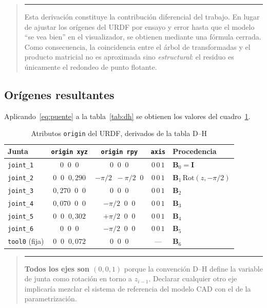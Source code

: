 \documentclass[11pt,a4paper]{article}
\newcommand{\mat}[1]{\mathbf{#1}}
\newenvironment{nota}
  {\begin{quote}\small\color{oscuro}\rule{2pt}{\baselineskip}\hspace{6pt}\ignorespaces}
  {\end{quote}}
\begin{document}
\begin{nota}
Esta derivación constituye la contribución diferencial del trabajo. En
lugar de ajustar los orígenes del URDF por ensayo y error hasta que el
modelo ``se vea bien'' en el visualizador, se obtienen mediante una
fórmula cerrada. Como consecuencia, la coincidencia entre el árbol de
transformadas y el producto matricial no es aproximada sino
\emph{estructural}: el residuo es únicamente el redondeo de punto
flotante.
\end{nota}

\subsection{Orígenes resultantes}

Aplicando~\eqref{eq:puente} a la tabla~\ref{tab:dh} se obtienen los
valores del cuadro~\ref{tab:origenesurdf}.

\begin{table}[h]
\centering
\caption{Atributos \texttt{origin} del URDF, derivados de la tabla D--H}
\label{tab:origenesurdf}
\small
\begin{tabular}{@{}lcccl@{}}
\toprule
\textbf{Junta} & \texttt{origin xyz} & \texttt{origin rpy} & \texttt{axis} & \textbf{Procedencia} \\
\midrule
\texttt{joint\_1} & $0\;\;0\;\;0$ & $0\;\;0\;\;0$ & $0\,0\,1$ & $\mat{B}_0 = \mat{I}$ \\
\texttt{joint\_2} & $0\;\;0\;\;0{,}290$ & $-\pi/2\;\;-\pi/2\;\;0$ & $0\,0\,1$ & $\mat{B}_1\,\mathrm{Rot}(z,-\pi/2)$ \\
\texttt{joint\_3} & $0{,}270\;\;0\;\;0$ & $0\;\;0\;\;0$ & $0\,0\,1$ & $\mat{B}_2$ \\
\texttt{joint\_4} & $0{,}070\;\;0\;\;0$ & $-\pi/2\;\;0\;\;0$ & $0\,0\,1$ & $\mat{B}_3$ \\
\texttt{joint\_5} & $0\;\;0\;\;0{,}302$ & $+\pi/2\;\;0\;\;0$ & $0\,0\,1$ & $\mat{B}_4$ \\
\texttt{joint\_6} & $0\;\;0\;\;0$ & $-\pi/2\;\;0\;\;0$ & $0\,0\,1$ & $\mat{B}_5$ \\
\texttt{tool0} (fija) & $0\;\;0\;\;0{,}072$ & $0\;\;0\;\;0$ & --- & $\mat{B}_6$ \\
\bottomrule
\end{tabular}
\end{table}

\begin{nota}
\textbf{Todos los ejes son $(0,0,1)$} porque la convención D--H define
la variable de junta como rotación en torno a $z_{i-1}$. Declarar
cualquier otro eje implicaría mezclar el sistema de referencia del
modelo CAD con el de la parametrización.
\end{nota}
\end{document}
